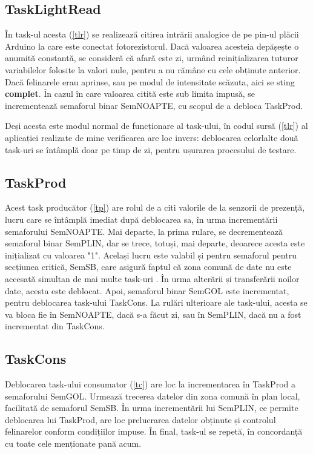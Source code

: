 \subsection{TaskLightRead} \label{light}
 În task-ul acesta (\ref{tlr}) se realizează citirea intrării analogice de pe pin-ul plăcii Arduino la care este conectat fotorezistorul. Dacă valoarea acesteia depășește o anumită constantă, se consideră că afară este zi, urmând reinițializarea tuturor variabilelor folosite la valori nule, pentru a nu rămâne cu cele obținute anterior. Dacă felinarele erau aprinse, sau pe modul de intensitate scăzuta, aici se sting \textbf{complet}. În cazul în care valoarea citită este sub limita impusă, se incrementează semaforul binar SemNOAPTE, cu scopul de a debloca TaskProd.

 Deși acesta este modul normal de funcționare al task-ului, în codul sursă (\ref{tlr}) al aplicației realizate de mine verificarea are loc invers: deblocarea celorlalte două task-uri se întâmplă doar pe timp de zi, pentru ușurarea procesului de testare.
\subsection{TaskProd}
 Acest task producător (\ref{tp}) are rolul de a citi valorile de la senzorii de prezență, lucru care se întâmplă imediat după deblocarea sa, în urma incrementării semaforului SemNOAPTE. Mai departe, la prima rulare, se decrementează semaforul binar SemPLIN, dar se trece, totuși, mai departe, deoarece acesta este inițializat cu valoarea "1". Același lucru este valabil și pentru semaforul pentru secțiunea critică, SemSB, care asigură faptul că zona comună de date nu este accesată simultan de mai multe task-uri \cite{patr}. În urma alterării și transferării noilor date, acesta este deblocat. Apoi, semaforul binar SemGOL este incrementat, pentru deblocarea task-ului TaskCons. La rulări ulterioare ale task-ului, acesta se va bloca fie în SemNOAPTE, dacă s-a făcut zi, sau în SemPLIN, dacă nu a fost incrementat din TaskCons. 
\subsection{TaskCons}
 Deblocarea task-ului consumator (\ref{tc}) are loc la incrementarea în TaskProd a semaforului SemGOL. Urmează trecerea datelor din zona comună în plan local, facilitată de semaforul SemSB. În urma incrementării lui SemPLIN, ce permite deblocarea lui TaskProd, are loc prelucrarea datelor obținute și controlul felinarelor conform condițiilor impuse. În final, task-ul se repetă, în concordanță cu toate cele menționate pană acum.

